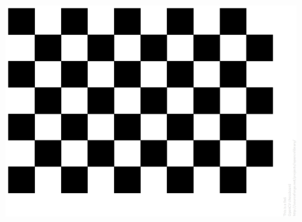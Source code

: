 \begin{figure}[h]
\centering
\includegraphics[width=\textwidth]{figures/checkerbord_pattern.png}
\caption{}
\label{fig:checkerbord_pattern}
\end{figure}


